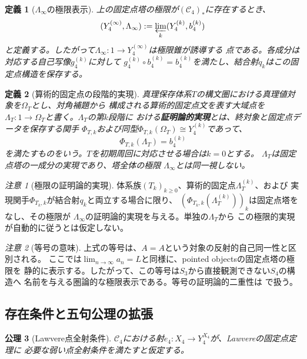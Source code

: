 \documentclass[11pt,a4paper]{ltjsarticle}
\newtheorem{definition}{定義}[section]
\newtheorem{axiom}[definition]{公理}
\theoremstyle{remark}
\newtheorem*{remark}{注意}
\newcommand{\LawvereInfinity}{\Lambda_\infty}
\newcommand{\ArithmeticFixedPoint}{\Lambda_T}
\begin{document}
\begin{definition}[$\LawvereInfinity$の極限表示]
上の固定点塔の極限が$(\mathcal{C}_4)_*$に存在するとき、
\[
 (Y_4^{(\infty)},\LawvereInfinity)
 :=\varprojlim_k (Y_4^{(k)},b_4^{(k)})
\]
と定義する。したがって$\LawvereInfinity:1\to Y_4^{(\infty)}$は極限錐が誘導する
点である。各成分は対応する自己写像$g_4^{(k)}$に対して
$g_4^{(k)}\circ b_4^{(k)}=b_4^{(k)}$を満たし、結合射$q_k$はこの固定点構造を保存する。
\end{definition}

\begin{definition}[算術的固定点の段階的実現]
真理保存体系$T$の構文圏における真理値対象を$\Omega_T$とし、対角補題から
構成される算術的固定点文を表す大域点を
$\ArithmeticFixedPoint:1\to\Omega_T$と書く。$\ArithmeticFixedPoint$の第$k$段階に
おける\textbf{証明論的実現}とは、終対象と固定点データを保存する関手
$\Phi_{T,k}$および同型$\Phi_{T,k}(\Omega_T)\cong Y_4^{(k)}$であって、
\[
 \Phi_{T,k}(\ArithmeticFixedPoint)=b_4^{(k)}
\]
を満たすものをいう。$T$を初期周回に対応させる場合は$k=0$とする。
$\ArithmeticFixedPoint$は固定点塔の一成分の実現であり、塔全体の極限
$\LawvereInfinity$とは同一視しない。
\end{definition}

\begin{remark}[極限の証明論的実現]
体系族$(T_k)_{k\geq0}$、算術的固定点$\ArithmeticFixedPoint^{(k)}$、および
実現関手$\Phi_{T_k,k}$が結合射$q_k$と両立する場合に限り、
$(\Phi_{T_k,k}(\ArithmeticFixedPoint^{(k)}))_k$は固定点塔をなし、その極限が
$\LawvereInfinity$の証明論的実現を与える。単独の$\ArithmeticFixedPoint$から
この極限的実現が自動的に従うとは仮定しない。
\end{remark}

\begin{remark}[等号の意味]
上式の等号は、$A=A$という対象の反射的自己同一性と区別される。
ここでは$\lim_{n\to\infty}a_n=L$と同様に、pointed objectsの固定点塔の極限を
静的に表示する。したがって、この等号は$S_3$から直接観測できない$S_4$の構造へ
名前を与える圏論的な極限表示である。等号の証明論的二重性は
\cite{ChibaLambda2026}で扱う。
\end{remark}

\subsection{存在条件と五句公理の拡張}

\begin{axiom}[Lawvere点全射条件]
$\mathcal{C}_4$における射$e_4:X_4\to Y_4^{X_4}$が、Lawvereの固定点定理に
必要な弱い点全射条件を満たすと仮定する。
\end{axiom}
\end{document}
